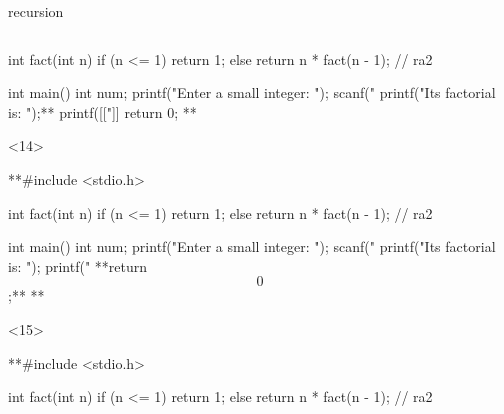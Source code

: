 \documentclass[10pt,t,svgnames]{beamer}
\begin{document}
\begin{frame}[fragile]{recursion}
\begin{columns}
\begin{column}{.65\textwidth}
\begin{scriptsize}
\begin{onlyenv}
\begin{codeblock}[gobble=8]
              int fact(int n) {
                if (n <= 1) {
                  return 1;
                }
                else {
                  return n * fact(n - 1); // ra2
                }
              }

              int main() {
                int num;
                printf("Enter a small integer: ");
                scanf("%
                printf("Its factorial is: ");**
                printf([["]]%
                return 0;
              }**
            \end{codeblock}
          \end{onlyenv}
          \begin{onlyenv}<14>
            \begin{codeblock}[gobble=8]
              **#include <stdio.h>

              int fact(int n) {
                if (n <= 1) {
                  return 1;
                }
                else {
                  return n * fact(n - 1); // ra2
                }
              }

              int main() {
                int num;
                printf("Enter a small integer: ");
                scanf("%
                printf("Its factorial is: ");
                printf("%
                **return $$0$$;**
              }**
            \end{codeblock}
          \end{onlyenv}
          \begin{onlyenv}<15>
            \begin{codeblock}[gobble=8]
              **#include <stdio.h>

              int fact(int n) {
                if (n <= 1) {
                  return 1;
                }
                else {
                  return n * fact(n - 1); // ra2
                }
              }


\end{codeblock}
\end{onlyenv}
\end{scriptsize}
\end{column}
\end{columns}
\end{frame}
\end{document}
